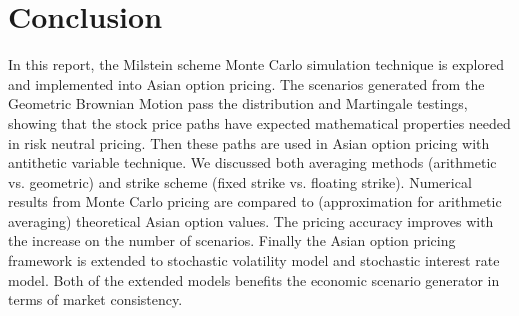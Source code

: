 \documentclass[a4paper,11pt] {article}
\begin{document}
\section{Conclusion}
In this report, the Milstein scheme Monte Carlo simulation technique is explored and implemented into Asian option pricing. The scenarios generated from the Geometric Brownian Motion pass the distribution and Martingale testings, showing that the stock price paths have expected mathematical properties needed in risk neutral pricing. Then these paths are used in Asian option pricing with antithetic variable technique. We discussed both averaging methods (arithmetic vs. geometric) and strike scheme (fixed strike vs. floating strike). Numerical results from Monte Carlo pricing are compared to (approximation for arithmetic averaging) theoretical Asian option values. The pricing accuracy improves with the increase on the number of scenarios. Finally the Asian option pricing framework is extended to stochastic volatility model and stochastic interest rate model. Both of the extended models benefits the economic scenario generator in terms of market consistency.


%
\end{document}
